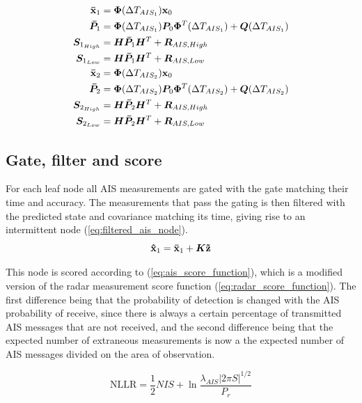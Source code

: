\begin{equation}\label{eq:predicted_origin_state_ais_time}
\begin{split}
\boldsymbol{\mathbf{\bar{x}}}_1 	&= \bm{\Phi}(\Delta T_{AIS_1}) \boldsymbol{\mathbf{x}}_0 \\
\bm{\bar{P}}_1	&= \bm{\Phi}(\Delta T_{AIS_1}) \bm{P}_0 \bm{\Phi}^T(\Delta T_{AIS_1}) + \bm{Q}(\Delta T_{AIS_1}) \\
\bm{S}_{1_{High}}&= \bm{H} \bm{\bar{P}}_1 \bm{H}^T + \bm{R}_{AIS, High} \\
\bm{S}_{1_{Low}}	&= \bm{H} \bm{\bar{P}}_1 \bm{H}^T + \bm{R}_{AIS, Low} \\
\boldsymbol{\mathbf{\bar{x}}}_2 	&= \bm{\Phi}(\Delta T_{AIS_2}) \boldsymbol{\mathbf{x}}_0 \\
\bm{\bar{P}}_2	&= \bm{\Phi}(\Delta T_{AIS_2}) \bm{P}_0 \bm{\Phi}^T(\Delta T_{AIS_2}) + \bm{Q}(\Delta T_{AIS_2}) \\
\bm{S}_{2_{High}}&= \bm{H} \bm{\bar{P}}_2 \bm{H}^T + \bm{R}_{AIS, High} \\
\bm{S}_{2_{Low}}	&= \bm{H} \bm{\bar{P}}_2 \bm{H}^T + \bm{R}_{AIS, Low} \\
\end{split}
\end{equation}

\subsection{Gate, filter and score}\label{sec:ais_gate_filter_score}
For each leaf node all AIS measurements are gated with the gate matching their time and accuracy. The measurements that pass the gating is then filtered with the predicted state and covariance matching its time, giving rise to an intermittent node (\ref{eq:filtered_ais_node}).
\begin{equation}\label{eq:filtered_ais_node}
\boldsymbol{\mathbf{\hat{x}}}_1 = \boldsymbol{\mathbf{\bar{x}}}_1 + \bm{K} \boldsymbol{\mathbf{\tilde{z}}}
\end{equation}

This node is scored according to (\ref{eq:ais_score_function}), which is a modified version of the radar measurement score function (\ref{eq:radar_score_function}). The first difference being that the probability of detection is changed with the AIS probability of receive, since there is always a certain percentage of transmitted AIS messages that are not received, and the second difference being that the expected number of extraneous measurements is now a the expected number of AIS messages divided on the area of observation. 

\begin{equation}\label{eq:ais_score_function}
\mathrm{NLLR} = \frac{1}{2} NIS + \ln \frac{\lambda_{AIS} |2 \pi S|^{1/2}} {P_r}			
\end{equation}

